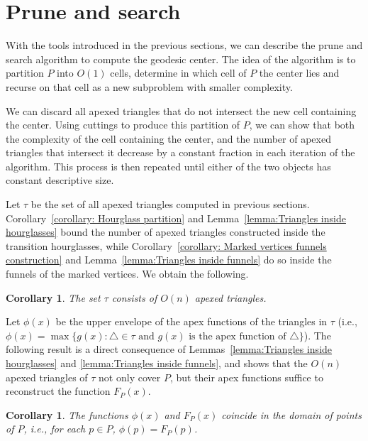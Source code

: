 \documentclass[a4paper]{article}
\newtheorem{corollary}[theorem]{Corollary}
\newcommand{\F}[2]{\ensuremath{F_{\scriptscriptstyle #1}(#2)}}
\newcommand{\fn}[2]{\ensuremath{S_{\scriptscriptstyle #1}(#2)}}
\newcommand{\ff}[1]{\ensuremath{f(#1)}}
\newcommand{\g}[2]{\ensuremath{|\pi(#1, #2)|}}
\begin{document}
\section{Prune and search}\label{section:Prune and search}
With the tools introduced in the previous sections, we can describe the prune and search algorithm to compute the geodesic center. 
The idea of the algorithm is to partition $P$ into $O(1)$ cells, determine in which cell of $P$ the center lies and recurse on that cell as a new subproblem with smaller complexity.

We can discard all apexed triangles that do not intersect the new cell containing the center. Using cuttings to produce this partition of $P$, we can show that both the complexity of the cell containing the center, and the number of apexed triangles that intersect it decrease by a constant fraction in each iteration of the algorithm. This process is then repeated until either of the two objects has constant descriptive size. 

Let $\tau$ be the set of all apexed triangles computed in previous sections. 
Corollary~\ref{corollary: Hourglass partition} and Lemma~\ref{lemma:Triangles inside hourglasses} bound the number of apexed triangles constructed inside the transition hourglasses, while Corollary~\ref{corollary: Marked vertices funnels construction} and Lemma~\ref{lemma:Triangles inside funnels} do so inside the funnels of the marked vertices. We obtain the following.

\begin{corollary}\label{lemma:Size of tau}
The set $\tau$ consists of $O(n)$ apexed triangles.
\end{corollary}

Let $\phi(x)$ be the upper envelope of the apex functions of the triangles in $\tau$ (i.e., $\phi(x) = \max\{g(x) : \triangle \in \tau\text{ and $g(x)$ is the apex function of $\triangle$} \}$). The following result is a direct consequence of Lemmas~\ref{lemma:Triangles inside hourglasses} and \ref{lemma:Triangles inside funnels}, and shows that the $O(n)$ apexed triangles of $\tau$ not only cover $P$, but their apex functions suffice to reconstruct the function $\F{P}{x}$.

\begin{corollary}\label{corollary:Optimization problem same as geodesic center}
The functions $\phi(x)$ and $\F{P}{x}$ coincide in the domain of points of $P$, i.e., for each $p\in P$, $\phi(p) = \F{P}{p}$.
\end{corollary}
\end{document}
